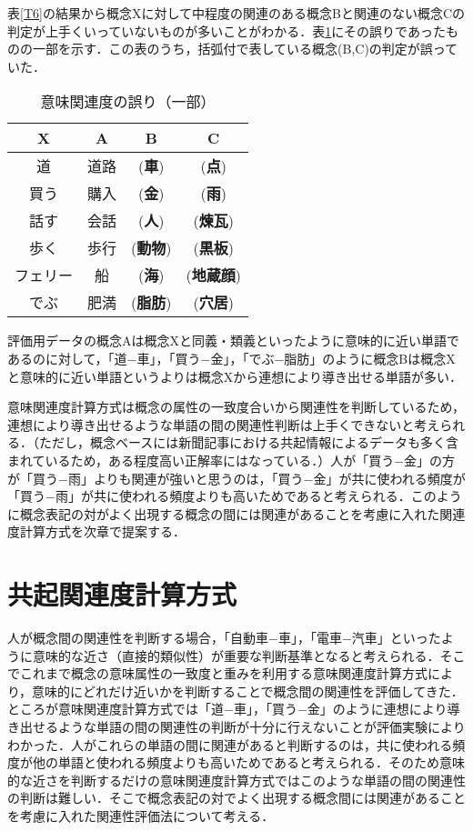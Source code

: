 表\ref{T6}の結果から概念Xに対して中程度の関連のある概念Bと関連のない概念Cの判定が上手くいっていないものが多いことがわかる．表\ref{T7}にその誤りであったものの一部を示す．この表のうち，括弧付で表している概念(B,C)の判定が誤っていた．

\begin{table}[tb]
\caption[]{意味関連度の誤り（一部）}
\label{T7}
\begin{center}
\begin{tabular}{|c|c|c|c|} \hline
X & A & B & C \\ \hline\hline
道       & 道路 & ({\bf 車})   & ({\bf 点})     \\ \hline
買う     & 購入 & ({\bf 金})   & ({\bf 雨})     \\ \hline
話す     & 会話 & ({\bf 人})   & ({\bf 煉瓦})   \\ \hline
歩く     & 歩行 & ({\bf 動物}) & ({\bf 黒板})   \\ \hline
フェリー & 船   & ({\bf 海})   & ({\bf 地蔵顔}) \\ \hline
でぶ     & 肥満 & ({\bf 脂肪}) & ({\bf 穴居})   \\ \hline
\end{tabular}
\end{center}
\end{table}

評価用データの概念Aは概念Xと同義・類義といったように意味的に近い単語であるのに対して，「道−車」，「買う−金」，「でぶ−脂肪」のように概念Bは概念Xと意味的に近い単語というよりは概念Xから連想により導き出せる単語が多い．

意味関連度計算方式は概念の属性の一致度合いから関連性を判断しているため，連想により導き出せるような単語の間の関連性判断は上手くできないと考えられる．（ただし，概念ベースには新聞記事における共起情報によるデータも多く含まれているため，ある程度高い正解率にはなっている．）人が「買う−金」の方が「買う−雨」よりも関連が強いと思うのは，「買う−金」が共に使われる頻度が「買う−雨」が共に使われる頻度よりも高いためであると考えられる．このように概念表記の対がよく出現する概念の間には関連があることを考慮に入れた関連度計算方式を次章で提案する．


\section{共起関連度計算方式} \label{S5}


人が概念間の関連性を判断する場合，「自動車−車」，「電車−汽車」といったように意味的な近さ（直接的類似性）が重要な判断基準となると考えられる．そこでこれまで概念の意味属性の一致度と重みを利用する意味関連度計算方式により，意味的にどれだけ近いかを判断することで概念間の関連性を評価してきた．ところが意味関連度計算方式では「道−車」，「買う−金」のように連想により導き出せるような単語の間の関連性の判断が十分に行えないことが評価実験によりわかった．人がこれらの単語の間に関連があると判断するのは，共に使われる頻度が他の単語と使われる頻度よりも高いためであると考えられる．そのため意味的な近さを判断するだけの意味関連度計算方式ではこのような単語の間の関連性の判断は難しい．そこで概念表記の対でよく出現する概念間には関連があることを考慮に入れた関連性評価法について考える．

